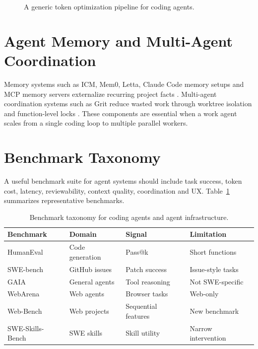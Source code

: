 \documentclass[11pt]{article}
\begin{document}
\begin{figure}[h]
\centering
{}
\caption{A generic token optimization pipeline for coding agents.}
\label{fig:pipeline}
\end{figure}

\section{Agent Memory and Multi-Agent Coordination}
Memory systems such as ICM, Mem0, Letta, Claude Code memory setups and MCP memory servers externalize recurring project facts \cite{icm,mem0,letta}. Multi-agent coordination systems such as Grit reduce wasted work through worktree isolation and function-level locks \cite{grit}. These components are essential when a work agent scales from a single coding loop to multiple parallel workers.

\section{Benchmark Taxonomy}
A useful benchmark suite for agent systems should include task success, token cost, latency, reviewability, context quality, coordination and UX. Table~\ref{tab:benchmarks} summarizes representative benchmarks.

\begin{table}[h]
\centering
\small
\begin{tabular}{llll}
\toprule
Benchmark & Domain & Signal & Limitation \\
\midrule
HumanEval & Code generation & Pass@k & Short functions \\
SWE-bench & GitHub issues & Patch success & Issue-style tasks \\
GAIA & General agents & Tool reasoning & Not SWE-specific \\
WebArena & Web agents & Browser tasks & Web-only \\
Web-Bench & Web projects & Sequential features & New benchmark \\
SWE-Skills-Bench & SWE skills & Skill utility & Narrow intervention \\
\bottomrule
\end{tabular}
\caption{Benchmark taxonomy for coding agents and agent infrastructure.}
\label{tab:benchmarks}
\end{table}
\end{document}

